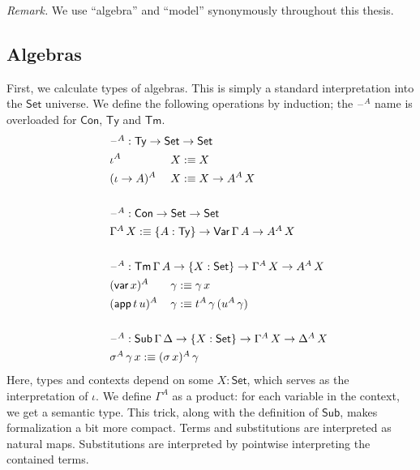 \documentclass[12pt,a4paper,twoside,openany]{book}
\theoremstyle{remark}
\theoremstyle{definition}
\theoremstyle{theorem}
\newcommand{\ms}[1]{\mathsf{#1}}
\newcommand{\Con}{\mathsf{Con}}
\newcommand{\Sub}{\mathsf{Sub}}
\newcommand{\Tm}{\mathsf{Tm}}
\newcommand{\Ty}{\mathsf{Ty}}
\newcommand{\blank}{\mathord{\hspace{1pt}\text{--}\hspace{1pt}}}
\newcommand{\Set}{\mathsf{Set}}
\newcommand{\Var}{\ms{Var}}
\newcommand{\var}{\ms{var}}
\newcommand{\app}{\ms{app}}
\newcommand{\defn}{:\equiv}
\begin{document}
\emph{Remark.} We use ``algebra'' and ``model'' synonymously throughout
this thesis.

\subsection{Algebras}

First, we calculate types of algebras. This is simply a standard interpretation
into the $\Set$ universe. We define the following operations by induction; the
$\blank^A$ name is overloaded for $\Con$, $\Ty$ and $\Tm$.
\begin{alignat*}{3}
& \hspace{-4em} \rlap{$\blank^A : \Ty \to \Set \to \Set$} \\
& \hspace{-4em} \iota^A\,&&X \defn X \\
& \hspace{-4em} (\iota\to A)^A\,&&X \defn X \to A^A\,X\\
& \hspace{-4em} && \\
& \hspace{-4em} \rlap{$\blank^A : \Con \to \Set \to \Set$}\\
& \hspace{-4em} \rlap{$\Gamma^A\,X \defn \{A : \Ty\} \to \Var\,\Gamma\,A \to A^A\,X$}\\
& \hspace{-4em} && \\
& \hspace{-4em} \rlap{$\blank^A : \Tm\,\Gamma\,A \to \{X : \Set\} \to \Gamma^A\,X \to A^A\,X$}\\
& \hspace{-4em} (\var\,x)^A\,&&\gamma \defn \gamma\,x\\
& \hspace{-4em} (\app\,t\,u)^A\,&&\gamma \defn t^A\,\gamma\,(u^A\,\gamma)\\
& \hspace{-4em} && \\
& \hspace{-4em} \rlap{$\blank^A : \Sub\,\Gamma\,\Delta \to \{X : \Set\} \to \Gamma^A\,X \to \Delta^A\,X$}\\
& \hspace{-4em} \rlap{$\sigma^A\,\gamma\,x \defn (\sigma\,x)^A\,\gamma$}
\end{alignat*}
Here, types and contexts depend on some $X : \Set$, which serves as the
interpretation of $\iota$. We define $\Gamma^A$ as a product: for each variable
in the context, we get a semantic type. This trick, along with the definition of
$\Sub$, makes formalization a bit more compact. Terms and substitutions are
interpreted as natural maps. Substitutions are interpreted by pointwise interpreting
the contained terms.
\end{document}
